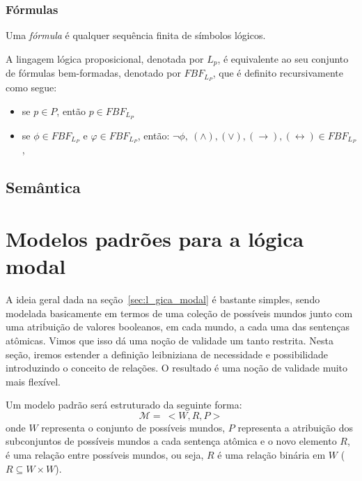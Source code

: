 \subsubsection{Fórmulas}
Uma \textit{fórmula} é qualquer sequência finita de símbolos lógicos. 

\begin{definition}
    A lingagem lógica proposicional, denotada por $L_p$, é equivalente ao seu
    conjunto de fórmulas bem-formadas, denotado por $FBF_{L_P}$, que é definito
    recursivamente como segue:
    \begin{itemize}
        \item se $p \in P$, então $p \in FBF_{L_P}$
            \item se $\phi \in FBF_{L_P}$ e $\varphi \in FBF_{L_P}$, então: $\neg
                \phi,\ (\wedge), (\vee), (\rightarrow), (\leftrightarrow) \in FBF_{L_P}$, 
            
    \end{itemize}
\end{definition}

\subsection{Semântica}

\section{Modelos padrões para a lógica modal}
\label{sec:modelos_padroes}

A ideia geral dada na seção~\ref{sec:l_gica_modal} é bastante simples, sendo
modelada basicamente em termos de uma coleção de possíveis mundos junto com uma
atribuição de valores booleanos, em cada mundo, a cada uma das sentenças
at\^omicas. Vimos que isso dá uma noção de validade um tanto restrita.
Nesta seção, iremos estender a definição leibniziana de necessidade e
possibilidade introduzindo o conceito de relações. O resultado é uma noção de
validade muito mais flexível.

Um modelo padrão será estruturado da seguinte forma:
\begin{equation}
    \label{eq:mod_padrao}
    \mathcal{M} =\ <W,R,P>
\end{equation}
onde $W$ representa o conjunto de possíveis mundos, $P$ representa a atribuição
dos subconjuntos de possíveis mundos a cada sentença at\^omica e o novo elemento
$R$, é uma relação entre possíveis mundos, ou seja, $R$ é uma relação binária em
$W$ ($R \subseteq W \times W$).


